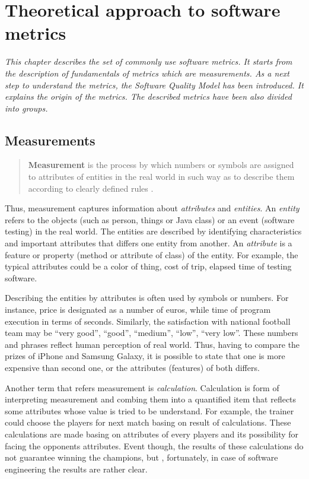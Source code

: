 \chapter{Theoretical approach to software metrics} \label{roz:metrics_theory}

\textit{This chapter describes the set of commonly use software metrics. It starts from the description of fundamentals of metrics which are measurements. As a next step to understand the metrics, the Software Quality Model has been introduced. It explains the origin of the metrics. The described metrics have been also divided into groups.} 

\section{Measurements}

\begin{quote}
\textbf{Measurement} is the process by which numbers or symbols are assigned to attributes of entities in the real world in such way as to describe them according to clearly defined rules \cite{rigorous}.
\end{quote}

Thus, measurement captures information about \textit{attributes} and \textit{entities}. An \textit{entity} refers to the objects (such as person, things or Java class) or an event (software testing) in the real world. The entities are described by identifying characteristics and important attributes that differs one entity from another. An \textit{attribute} is a feature or property (method or attribute of class) of the entity. For example, the typical attributes could be a color of thing, cost of trip, elapsed time of testing software.  

Describing the entities by attributes is often used by symbols or numbers. For instance, price is designated as a number of euros, while time of program execution in terms of seconds. Similarly, the satisfaction with national football team  may be ``very good'', ``good'', ``medium'', ``low'', ``very low''. These numbers and phrases reflect human perception of real world. Thus, having to compare the prizes of iPhone and Samsung Galaxy, it is possible to state that one is more expensive than second one, or the attributes (features) of both differs. 

Another term that refers measurement is \textit{calculation}. Calculation is form of interpreting measurement and combing them into a quantified item that reflects some attributes whose value is tried to be understand. For example, the trainer could choose the players for next match basing on result of calculations. These calculations are made basing on attributes of every players and its possibility for facing the opponents attributes. Event though, the results of these calculations do not guarantee winning the champions, but , fortunately, in case of software engineering the results are rather clear.   

